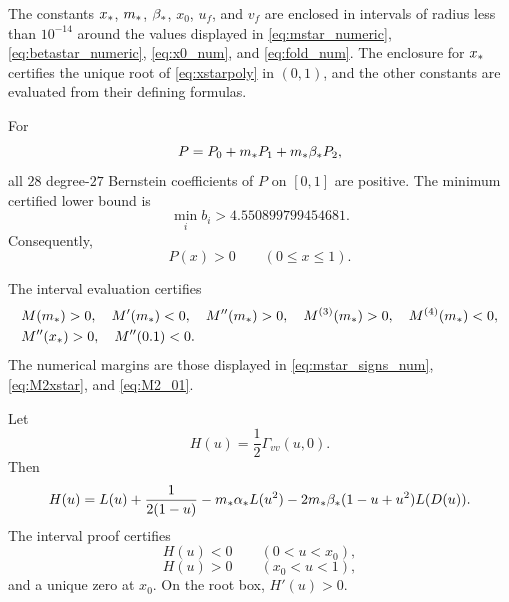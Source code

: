\begin{proposition}\label{prop:A1}
The constants \(x_*\), \(m_*\), \(\beta_*\), \(x_0\), \(u_f\), and \(v_f\)
are enclosed in intervals of radius less than \(10^{-14}\) around the values
displayed in \eqref{eq:mstar_numeric}, \eqref{eq:betastar_numeric},
\eqref{eq:x0_num}, and \eqref{eq:fold_num}.  The enclosure for \(x_*\)
certifies the unique root of \eqref{eq:xstarpoly} in \((0,1)\), and the other
constants are evaluated from their defining formulas.
\end{proposition}

\begin{proposition}\label{prop:A2}
For
\[
  P=P_0+m_* P_1+m_*\beta_* P_2,
\]
all \(28\) degree-\(27\) Bernstein coefficients of \(P\) on \([0,1]\) are
positive.  The minimum certified lower bound is
\begin{equation}\label{eq:min_bern_app}
  \min_i b_i>4.550899799454681.
\end{equation}
Consequently,
\[
  P(x)>0\qquad(0\le x\le1).
\]
\end{proposition}

\begin{proposition}\label{prop:A3}
The interval evaluation certifies
\begin{align}\label{eq:A3_signs}
&M(m_*)>0,
\quad M'(m_*)<0,
\quad M''(m_*)>0,
\quad M^{(3)}(m_*)>0,
\quad M^{(4)}(m_*)<0,
\notag\\
&M''(x_*)>0,
\quad M''(0.1)<0.
\end{align}
The numerical margins are those displayed in \eqref{eq:mstar_signs_num},
\eqref{eq:M2xstar}, and \eqref{eq:M2_01}.
\end{proposition}

\begin{proposition}\label{prop:A4}
Let
\begin{equation}\label{eq:Hdef_appendix}
  H(u)=\frac12\Gamma_{vv}(u,0).
\end{equation}
Then
\begin{equation}\label{eq:Hexplicit_appendix}
  H(u)
  =
  L(u)+\frac{1}{2(1-u)}
  -m_*\alpha_* L(u^2)
  -2m_*\beta_*(1-u+u^2)L(D(u)).
\end{equation}
The interval proof certifies
\[
  H(u)<0\qquad(0<u<x_0),
\]
\[
  H(u)>0\qquad(x_0<u<1),
\]
and a unique zero at \(x_0\).  On the root box, \(H'(u)>0\).
\end{proposition}


